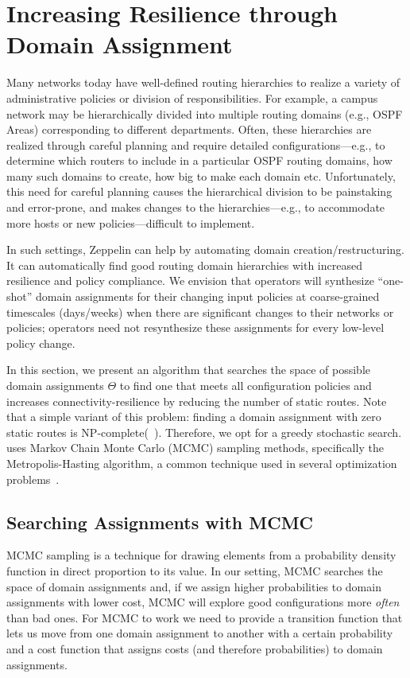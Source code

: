 \section{Increasing Resilience through Domain Assignment}
\label{sec:synth-dom-ass}
Many networks today have well-defined routing hierarchies to realize a variety of administrative  policies or division of responsibilities. For example, a campus network may be hierarchically divided into multiple routing domains (e.g., OSPF Areas) corresponding to different departments. Often, these hierarchies are realized through careful planning and require detailed configurations---e.g., to determine which routers to include in a particular OSPF routing domains, how many such domains to create, how big to make each domain etc. Unfortunately, this 
need for careful planning
causes the hierarchical division to be painstaking and error-prone, and makes changes to  the hierarchies---e.g., to accommodate more hosts or new policies---difficult to implement.

In such settings, Zeppelin can help by automating domain creation/restructuring. It can automatically find good routing domain hierarchies with increased resilience and policy compliance. We envision that operators will synthesize ``one-shot'' domain assignments for their changing input policies at coarse-grained timescales (days/weeks) when there are significant changes to their networks or policies; operators need not resynthesize these assignments for every low-level policy change.


In this section, we present an algorithm 
that searches the space of possible domain assignments $\Theta$ to find
one that meets all configuration policies and increases 
connectivity-resilience by reducing the number of static routes.
Note that a simple variant of this problem: 
finding a domain assignment with
zero static routes is NP-complete(~).
Therefore, we opt for a greedy
stochastic search.
\name uses Markov
Chain Monte Carlo (MCMC) sampling methods, 
specifically the Metropolis-Hasting
algorithm, a common technique used in several optimization 
problems~\cite{stoke}. 

\subsection{Searching Assignments with MCMC}
MCMC sampling is a technique for 
drawing elements from a
probability density function in direct proportion to its value.
In our setting, MCMC searches the space of domain assignments and,
if we assign higher probabilities to domain assignments with lower cost, MCMC will explore
good configurations more \emph{often} than bad ones.
For MCMC to work we need to provide a transition function that lets us move from one domain assignment
to another with a certain probability and a cost function that assigns costs (and therefore probabilities) to
domain assignments. 

